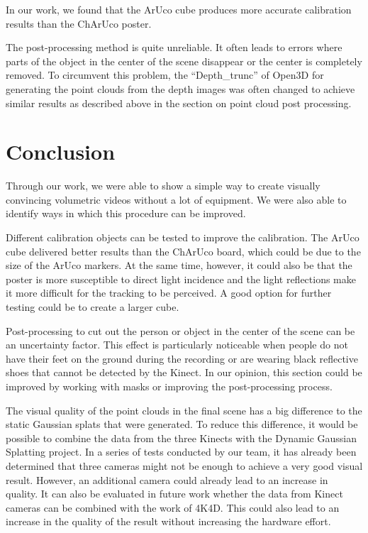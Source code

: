 \documentclass[conference]{IEEEtran}
\begin{document}
In our work, we found that the ArUco cube produces more accurate calibration results than the ChArUco poster.

The post-processing method is quite unreliable. It often leads to errors where parts of the object in the center of the scene disappear or the center is completely removed. To circumvent this problem, the “Depth\_trunc” of Open3D for generating the point clouds from the depth images was often changed to achieve similar results as described above in the section on point cloud post processing.

\section{Conclusion}
Through our work, we were able to show a simple way to create visually convincing volumetric videos without a lot of equipment.  We were also able to identify ways in which this procedure can be improved.

Different calibration objects can be tested to improve the calibration. The ArUco cube delivered better results than the ChArUco board, which could be due to the size of the ArUco markers. At the same time, however, it could also be that the poster is more susceptible to direct light incidence and the light reflections make it more difficult for the tracking to be perceived. A good option for further testing could be to create a larger cube.

Post-processing to cut out the person or object in the center of the scene can be an uncertainty factor. This effect is particularly noticeable when people do not have their feet on the ground during the recording or are wearing black reflective shoes that cannot be detected by the Kinect. In our opinion, this section could be improved by working with masks or improving the post-processing process.

The visual quality of the point clouds in the final scene has a big difference to the static Gaussian splats that were generated. To reduce this difference, it would be possible to combine the data from the three Kinects with the Dynamic Gaussian Splatting project. In a series of tests conducted by our team, it has already been determined that three cameras might not be enough to achieve a very good visual result. However, an additional camera could already lead to an increase in quality.
It can also be evaluated in future work whether the data from Kinect cameras can be combined with the work of 4K4D. This could also lead to an increase in the quality of the result without increasing the hardware effort.
\end{document}
